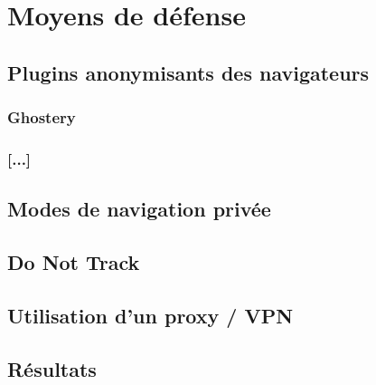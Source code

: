 \chapter{Moyens de défense}
	\section{Plugins anonymisants des navigateurs}
		\subsection{Ghostery}
		\subsection{[...]}
		
	\section{Modes de navigation privée}
		
	\section{Do Not Track}
		
	\section{Utilisation d'un proxy / VPN}
		
	\section{Résultats}
	\label{results_plugins}
		
